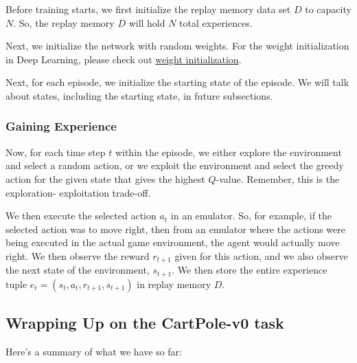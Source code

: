 Before training starts, we first initialize the replay memory data set $D$ to capacity 
$N$. So, the replay memory $D$ will hold $N$ total experiences.

Next, we initialize the network with random weights. For the weight initialization in 
Deep Learning, please check out \href{https://deeplizard.com/learn/video/8krd5qKVw-Q}{weight initialization}. 

Next, for each episode, we initialize the starting state of the episode. We will talk 
about states, including the starting state, in future subsections.


\subsubsection{Gaining Experience}

Now, for each time step $t$ within the episode, we either explore the environment and 
select a random action, or we exploit the environment and select the greedy action for 
the given state that gives the highest $Q$-value. Remember, this is the exploration-
exploitation trade-off.

We then execute the selected action $a_t$ in an emulator. So, for example, if the 
selected action was to move right, then from an emulator where the actions were being 
executed in the actual game environment, the agent would actually move right. We then 
observe the reward $r_{t+1}$ given for this action, and we also observe the next state 
of the environment, $s_{t+1}$. We then store the entire experience tuple 
$e_t = (s_t, a_t, r_{t+1}, s_{t+1})$ in replay memory $D$.


\subsection{Wrapping Up on the CartPole-v0 task}

Here's a summary of what we have so far:

